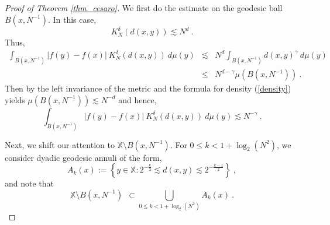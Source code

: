 \documentclass[12pt]{amsart}
\theoremstyle{definition}
\newcommand{\X}{\mathbb X}%
\numberwithin{equation}{section}
\begin{document}
\begin{proof}[Proof of Theorem \ref{thm_cesaro}]
We first do the estimate on the geodesic ball $B\left(x,N^{-1}\right)$. In this case,
\begin{equation*}
 K^\delta_N(d(x,y)) \lesssim N^d\:.
\end{equation*}
Thus,
\begin{eqnarray*}
\int_{B\left(x,N^{-1}\right)}  |f(y)-f(x)|\:K^\delta_N(d(x,y))\:d\mu(y) &\lesssim & N^d \int_{B\left(x,N^{-1}\right)} d(x,y)^\gamma\:d\mu(y) \\
& \le & N^{d-\gamma} \mu\left(B\left(x,N^{-1}\right)\right)\:.
\end{eqnarray*}
Then by the left invariance of the metric and the formula for density (\ref{density}) yields $\mu\left(B\left(x,N^{-1}\right)\right) \lesssim N^{-d}$ and hence,
\begin{equation} \label{cesaro_pf_eq2}
\int_{B\left(x,N^{-1}\right)}  |f(y)-f(x)|\:K^\delta_N(d(x,y))\:d\mu(y) \lesssim N^{-\gamma}\:.
\end{equation}

Next, we shift our attention to $\X \setminus B\left(x,N^{-1}\right)$. For $0 \le k <1+\log_2\left(N^2\right)$, we consider dyadic geodesic annuli of the form,
\begin{equation*}
A_k(x):=\left\{y \in \X : 2^{-\frac{k}{2}} \lesssim d(x,y)\lesssim 2^{-\frac{k-1}{2}}\right\}\:,
\end{equation*}
and note that
\begin{equation*}
\X \setminus B\left(x,N^{-1}\right) \:\:\subset \bigcup_{0\le k < 1+\log_2\left(N^2\right)} A_k(x)\:.
\end{equation*}


\end{proof}
\end{document}
